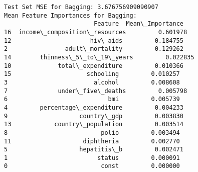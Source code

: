 \documentclass[11pt]{article}
\begin{document}
    \begin{Verbatim}[commandchars=\\\{\}]
Test Set MSE for Bagging: 3.676756909090907
Mean Feature Importances for Bagging:
                         Feature  Mean\_Importance
16  income\_composition\_resources         0.601978
12                      hiv\_aids         0.184755
2                adult\_mortality         0.129262
14        thinness\_5\_to\_19\_years         0.022835
10             total\_expenditure         0.010366
15                     schooling         0.010257
3                        alcohol         0.008608
7              under\_five\_deaths         0.005798
6                            bmi         0.005739
4         percentage\_expenditure         0.004233
9                    country\_gdp         0.003830
13            country\_population         0.003514
8                          polio         0.003494
11                    diphtheria         0.002770
5                    hepatitis\_b         0.002471
1                         status         0.000091
0                          const         0.000000
    \end{Verbatim}

    \begin{center}
    \end{center}
    { \hspace*{\fill} \\}
    
\end{document}
